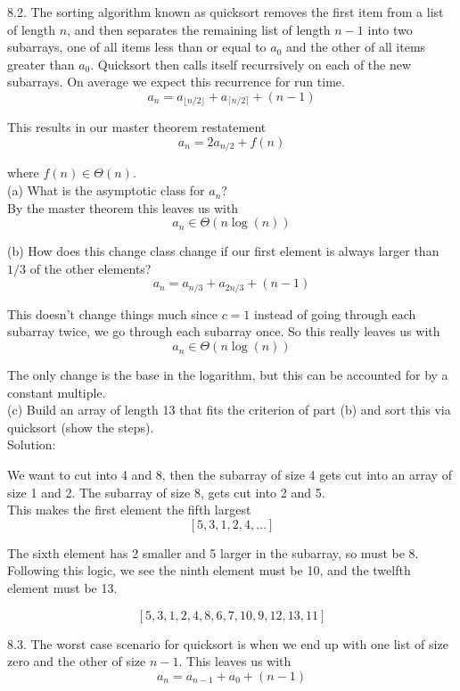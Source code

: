\documentclass[16 pt]{amsart}
\theoremstyle{definition}
\theoremstyle{remark}
\numberwithin{equation}{subsection}
\begin{document}
8.2. The sorting algorithm known as quicksort removes the first item from a list of length $n$, and then separates the remaining list of length $n-1$ into two subarrays, one of all items less than or equal to $a_0$ and the other of all items greater than $a_0$.  Quicksort then calls itself recurrsively on each of the new subarrays.  On average we expect this recurrence for run time.
\[
a_n = a_{\lfloor n/2\rfloor}+a_{\lceil n/2 \rceil} + (n-1)
\]

This results in our master theorem restatement 
\[
a_n = 2a_{n/2} + f(n)
\]

where $f(n)\in \Theta(n)$.\\

(a) What is the asymptotic class for $a_n$?\\

By the master theorem this leaves us with
\[
a_n \in \Theta (n\log(n))
\]



(b) How does this change class change if our first element is always larger than $1/3$ of the other elements?
\[
a_n = a_{n/3} + a_{2n/3} + (n-1)
\]


This doesn't change things much since $c=1$ instead of going through each subarray twice, we go through each subarray once.  So this really leaves us with
\[
a_n\in \Theta(n\log(n))
\]

The only change is the base in the logarithm, but this can be accounted for by a constant multiple.\\

(c) Build an array of length 13 that fits the criterion of part (b) and sort this via quicksort (show the steps).\\

Solution:

We want to cut into 4 and 8, then the subarray of size 4 gets cut into an array of size 1 and 2.  The subarray of size 8, gets cut into 2 and 5.\\  


This makes the first element the fifth largest
\[
[5,3,1,2,4,\dots ]
\]

The sixth element has 2 smaller and 5 larger in the subarray, so must be 8.  Following this logic, we see the ninth element must be 10, and the twelfth element must be 13.

\[
[5,3,1,2,4,8,6,7,10,9,12,13,11]
\]





8.3.  The worst case scenario for quicksort is when we end up with one list of size zero and the other of size $n-1$.  This leaves us with
\[
a_n = a_{n-1}+ a_0 + (n-1)
\]
\end{document}
